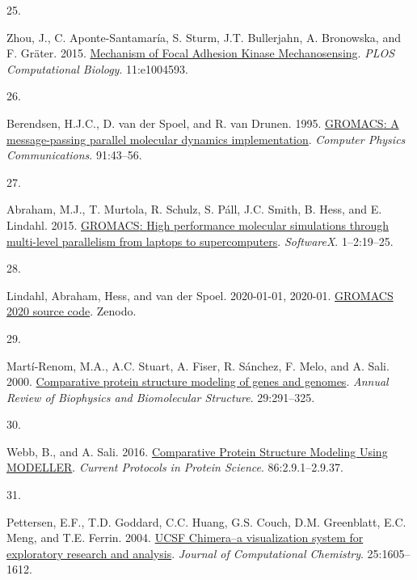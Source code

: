 \documentclass[
  twocolumn]{biophys-new-mod}
\newlength{\cslhangindent}
\newlength{\csllabelwidth}
\newlength{\cslentryspacingunit} %
\newenvironment{CSLReferences}[2] %
 {%
  \setlength{\parindent}{0pt}
  \ifodd #1
  \let\oldpar\par
  \def\par{\hangindent=\cslhangindent\oldpar}
  \fi
  \setlength{\parskip}{#2\cslentryspacingunit}
 }%
 {}
\newcommand{\CSLLeftMargin}[1]{\parbox[t]{\csllabelwidth}{#1}}
\newcommand{\CSLRightInline}[1]{\parbox[t]{\linewidth - \csllabelwidth}{#1}\break}
\begin{document}
\begin{CSLReferences}{0}{0}
\leavevmode{}%
\CSLLeftMargin{25. }%
\CSLRightInline{Zhou, J., C. Aponte-Santamaría, S. Sturm, J.T.
Bullerjahn, A. Bronowska, and F. Gräter. 2015.
\href{https://doi.org/10.1371/journal.pcbi.1004593}{Mechanism of {Focal
Adhesion Kinase Mechanosensing}}. \emph{PLOS Computational Biology}.
11:e1004593.}

\leavevmode{}%
\CSLLeftMargin{26. }%
\CSLRightInline{Berendsen, H.J.C., D. van der Spoel, and R. van Drunen.
1995. \href{https://doi.org/10.1016/0010-4655(95)00042-E}{{GROMACS}: {A}
message-passing parallel molecular dynamics implementation}.
\emph{Computer Physics Communications}. 91:43--56.}

\leavevmode{}%
\CSLLeftMargin{27. }%
\CSLRightInline{Abraham, M.J., T. Murtola, R. Schulz, S. Páll, J.C.
Smith, B. Hess, and E. Lindahl. 2015.
\href{https://doi.org/10.1016/j.softx.2015.06.001}{{GROMACS}: {High}
performance molecular simulations through multi-level parallelism from
laptops to supercomputers}. \emph{SoftwareX}. 1--2:19--25.}

\leavevmode{}%
\CSLLeftMargin{28. }%
\CSLRightInline{Lindahl, Abraham, Hess, and van der Spoel. 2020-01-01,
2020-01. \href{https://doi.org/10.5281/zenodo.3562495}{{GROMACS} 2020
source code}. {Zenodo}.}

\leavevmode{}%
\CSLLeftMargin{29. }%
\CSLRightInline{Martí-Renom, M.A., A.C. Stuart, A. Fiser, R. Sánchez, F.
Melo, and A. Sali. 2000.
\href{https://doi.org/10.1146/annurev.biophys.29.1.291}{Comparative
protein structure modeling of genes and genomes}. \emph{Annual Review of
Biophysics and Biomolecular Structure}. 29:291--325.}

\leavevmode{}%
\CSLLeftMargin{30. }%
\CSLRightInline{Webb, B., and A. Sali. 2016.
\href{https://doi.org/10.1002/cpps.20}{Comparative {Protein Structure
Modeling Using MODELLER}}. \emph{Current Protocols in Protein Science}.
86:2.9.1--2.9.37.}

\leavevmode{}%
\CSLLeftMargin{31. }%
\CSLRightInline{Pettersen, E.F., T.D. Goddard, C.C. Huang, G.S. Couch,
D.M. Greenblatt, E.C. Meng, and T.E. Ferrin. 2004.
\href{https://doi.org/10.1002/jcc.20084}{{UCSF Chimera--a} visualization
system for exploratory research and analysis}. \emph{Journal of
Computational Chemistry}. 25:1605--1612.}


\end{CSLReferences}
\end{document}

